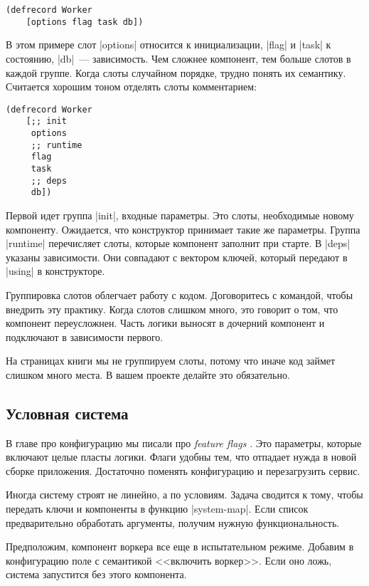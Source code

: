 \begin{verbatim}
(defrecord Worker
    [options flag task db])
\end{verbatim}

В этом примере слот \spverb|options| относится к инициализации, \spverb|flag| и
\spverb|task| к состоянию, \spverb|db|~--- зависимость. Чем сложнее компонент,
тем больше слотов в каждой группе. Когда слоты случайном порядке, трудно понять
их семантику. Считается хорошим тоном отделять слоты комментарием:

\begin{verbatim}
(defrecord Worker
    [;; init
     options
     ;; runtime
     flag
     task
     ;; deps
     db])
\end{verbatim}

Первой идет группа \spverb|init|, входные параметры. Это слоты, необходимые
новому компоненту. Ожидается, что конструктор принимает такие же
параметры. Группа \spverb|runtime| перечисляет слоты, которые компонент заполнит
при старте. В \spverb|deps| указаны зависимости. Они совпадают с вектором
ключей, который передают в \spverb|using| в конструкторе.

Группировка слотов облегчает работу с кодом. Договоритесь с командой, чтобы
внедрить эту практику. Когда слотов слишком много, это говорит о том, что
компонент переусложнен. Часть логики выносят в дочерний компонент и подключают в
зависимости первого.

На страницах книги мы не группируем слоты, потому что иначе код займет слишком
много места. В вашем проекте делайте это обязательно.

\subsection{Условная система}

В главе про конфигурацию мы писали про \emph{feature flags} .
Это параметры, которые включают целые пласты логики. Флаги удобны тем,
что отпадает нужда в новой сборке приложения. Достаточно поменять
конфигурацию и перезагрузить сервис.

Иногда систему строят не линейно, а по условиям. Задача сводится к тому, чтобы
передать ключи и компоненты в функцию \spverb|system-map|. Если список
предварительно обработать аргументы, получим нужную функциональность.

Предположим, компонент воркера все еще в испытательном режиме. Добавим в
конфигурацию поле с семантикой <<включить воркер>>. Если оно ложь, система
запустится без этого компонента.

